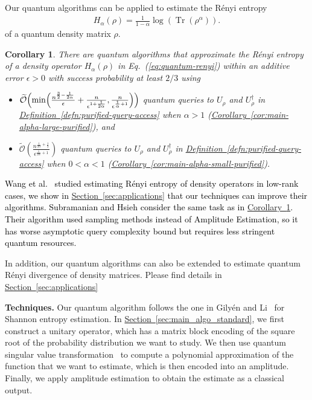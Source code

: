 \documentclass[journal]{IEEEtran}
\newtheorem{corollary}{Corollary}
\newcommand{\eq}[1]{Eq.~(\ref{eq:#1})}
\newcommand{\cor}[1]{\hyperref[cor:#1]{Corollary~\ref*{cor:#1}}}
\newcommand{\defn}[1]{\hyperref[defn:#1]{Definition~\ref*{defn:#1}}}
\renewcommand{\sec}[1]{\hyperref[sec:#1]{Section~\ref*{sec:#1}}}
\def\Tr{\operatorname{Tr}}\def\atanh{\operatorname{atanh}}\def\:{\hbox{\bf:}}
\begin{document}
\color{black}
Our quantum algorithms can be applied to estimate the R{\'e}nyi entropy
\begin{align}
\label{eq:quantum-renyi}
    H_{\alpha}(\rho) = \frac{1}{1-\alpha}\log(\Tr(\rho^{\alpha})).
\end{align}
of a quantum density matrix $\rho$.
\color{black}

\begin{corollary}
\label{cor:renyi-density}
There are quantum algorithms that approximate the R{\'e}nyi entropy of a density operator $H_\alpha(\rho)$ in \eq{quantum-renyi} within an additive error $\epsilon>0$ with success probability at least $2/3$ using
\begin{itemize}[leftmargin=15pt]
    \item $\widetilde{\mathcal{O}}\Bigl(\min\Bigl(\frac{n^{\frac{3}{2}-\frac{1}{2\alpha}}}{\epsilon} + \frac{n}{\epsilon^{1+\frac{1}{2\alpha}}}, \frac{n}{\epsilon^{\frac{1}{\alpha}+1}}\Bigr)\Bigr)$
 quantum queries to $U_{\rho}$ and $U_{\rho}^\dagger$ in \defn{purified-query-access} when $\alpha>1$ (\cor{main-alpha-large-purified}), and
    \item $\widetilde{\mathcal{O}}\left(\frac{n^{\frac{1}{2\alpha}+\frac{1}{2}}}{\epsilon^{\frac{1}{2\alpha}+1}}\right)$
 quantum queries to $U_{\rho}$ and $U_{\rho}^\dagger$ in \defn{purified-query-access} when $0<\alpha<1$ (\cor{main-alpha-small-purified}).
\end{itemize}
\end{corollary}

\textcolor{black}{Wang et al.~\cite{wang2022new} studied estimating R{\'e}nyi entropy of density operators in low-rank cases, we show in \sec{applications} that our techniques can improve their algorithms. Subramanian and Hsieh \cite{subramanian2021quantum} consider the same task as in \cor{renyi-density}. Their algorithm used sampling methods instead of Amplitude Estimation, so it has worse asymptotic query complexity bound but requires less stringent quantum resources.}

In addition, our quantum algorithms can also be extended to estimate quantum R{\'e}nyi divergence of density matrices. Please find details in \sec{applications}


\vspace{3mm}
\noindent
\textbf{Techniques.}
Our quantum algorithm follows the one in Gily{\'e}n and Li~\cite{gilyen2019distributional} for Shannon entropy estimation. In \sec{main_algo_standard}, we first construct a unitary operator, which has a matrix block encoding of the square root of the probability distribution we want to study. We then use quantum singular value transformation~\cite{gilyen2019singular} to compute a polynomial approximation of the function that we want to estimate, which is then encoded into an amplitude. Finally, we apply  amplitude estimation to obtain the estimate as a classical output.
\end{document}
